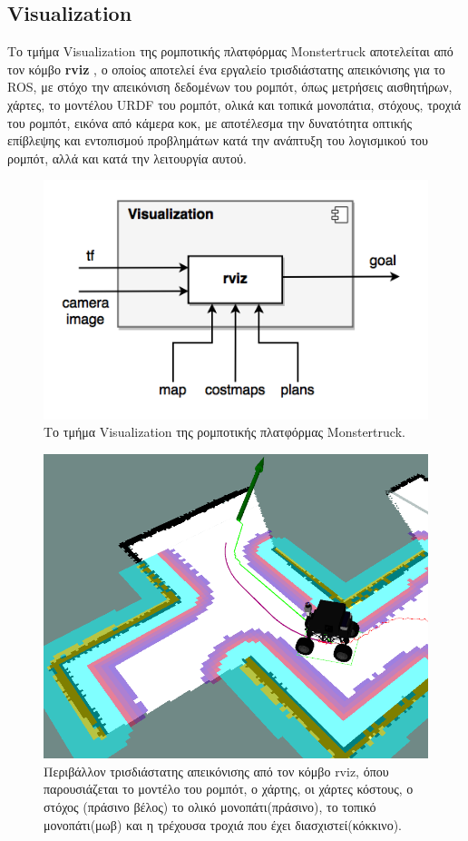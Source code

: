 \subsection{Visualization}
Το τμήμα Visualization της ρομποτικής πλατφόρμας Monstertruck αποτελείται από τον κόμβο \textbf{rviz} \cite{rviz}, ο οποίος αποτελεί ένα εργαλείο τρισδιάστατης απεικόνισης για το ROS, με στόχο την απεικόνιση δεδομένων του ρομπότ, όπως μετρήσεις αισθητήρων, χάρτες, το μοντέλου URDF του ρομπότ, ολικά και τοπικά μονοπάτια, στόχους, τροχιά του ρομπότ, εικόνα από κάμερα κοκ, με αποτέλεσμα την δυνατότητα οπτικής επίβλεψης και εντοπισμού προβλημάτων κατά την ανάπτυξη του λογισμικού του ρομπότ, αλλά και κατά την λειτουργία αυτού.

\begin{figure}[!ht]
	\centering
	\includegraphics[width=0.5\linewidth]{Chapters/Chapter4/Figures/visualization_component.png}
	\caption{Το τμήμα Visualization της ρομποτικής πλατφόρμας Monstertruck.}
	\label{fig:visualization_component}
\end{figure}


\begin{figure}[!ht]
	\centering
	\includegraphics[width=0.8\linewidth]{Chapters/Chapter4/Figures/rviz.png}
	\caption{Περιβάλλον τρισδιάστατης απεικόνισης από τον κόμβο rviz, όπου παρουσιάζεται το μοντέλο του ρομπότ, ο χάρτης, οι χάρτες κόστους, ο στόχος (πράσινο βέλος) το ολικό μονοπάτι(πράσινο), το τοπικό μονοπάτι(μωβ) και η τρέχουσα τροχιά που έχει διασχιστεί(κόκκινο).}
	\label{fig:rviz}
\end{figure}


